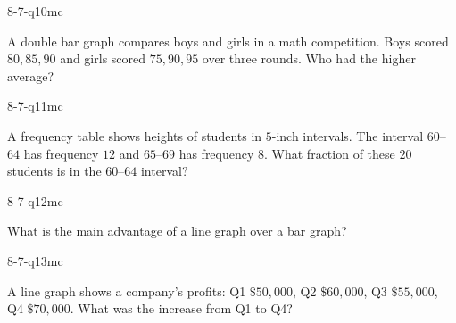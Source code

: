 \begin{practiceQuestion}{8-7-q10}{mc}
\begin{questionText}
A double bar graph compares boys and girls in a math competition. Boys scored $80, 85, 90$ and girls scored $75, 90, 95$ over three rounds. Who had the higher average?
\end{questionText}
\end{practiceQuestion}

\begin{practiceQuestion}{8-7-q11}{mc}
\begin{questionText}
A frequency table shows heights of students in $5$-inch intervals. The interval $60$--$64$ has frequency $12$ and $65$--$69$ has frequency $8$. What fraction of these $20$ students is in the $60$--$64$ interval?
\end{questionText}
\end{practiceQuestion}

\begin{practiceQuestion}{8-7-q12}{mc}
\begin{questionText}
What is the main advantage of a line graph over a bar graph?
\end{questionText}
\end{practiceQuestion}

\begin{practiceQuestion}{8-7-q13}{mc}
\begin{questionText}
A line graph shows a company's profits: Q1 $\$50{,}000$, Q2 $\$60{,}000$, Q3 $\$55{,}000$, Q4 $\$70{,}000$. What was the increase from Q1 to Q4?
\end{questionText}
\end{practiceQuestion}

